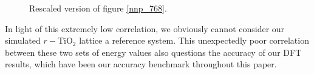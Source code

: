 \documentclass[aps,prb,twocolumn,amsmath,amssymb,superscriptaddress,longbibliography]{revtex4-1}
\begin{document}
\begin{figure}[htb]
\caption{Rescaled version of figure \ref{nnp_768}.}
\label{nnp_768d}
\end{figure}

In light of this extremely low correlation, we obviously cannot consider our simulated $r-\text{TiO}_2$ lattice a reference system.
This unexpectedly poor correlation between these two sets of energy values also questions the accuracy of our DFT results, which have been our accuracy benchmark throughout this paper.
\end{document}
